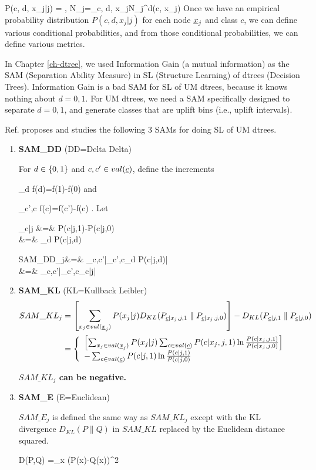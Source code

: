 \documentclass[12pt]{report}
\begin{document}
\beq
P(c, d, x_j|j)
=
\;,\;\; 
N_j=\sum_{c, d, x_j}N_j^d(c, x_j)
\eeq
Once
we have an empirical probability distribution
$P(c, d, x_j| j)$ for each node $\rvx_j$ and
class $c$,
we can define various conditional
probabilities, and from those
conditional probabilities,
we can define various metrics.



In Chapter
\ref{ch-dtree},
we used Information
Gain
(a mutual information)
as the SAM (Separation Ability Measure)
in
SL (Structure Learning)
of dtrees (Decision Trees).
Information Gain
is a bad
SAM for SL of UM dtrees,
because it knows nothing about
 $d=0,1$.
For
UM dtrees,
we need a SAM specifically
designed to separate $d=0,1$, and generate
classes that are
 uplift bins (i.e., uplift intervals).


Ref.\cite{jaros}
proposes and studies
the following
3 SAMs
for doing SL of UM dtrees.


\begin{enumerate}
\item{\bf SAM\_DD} (DD=Delta Delta)

For $d\in \{0,1\}$
and $c, c'\in val(\rvc)$, define the increments

\beq
\partial_d f(d)=f(1)-f(0)
\eeq
and

\beq
\partial_{c',c} f(c)=f(c')-f(c)
\;.
\eeq
Let

\beqa
\Delta_{c|j} &=& P(c|j,1)-P(c|j,0)
\\
&=& \partial_d P(c|j,d)
\label{eq-delta-c-j}
\eeqa

\beqa
SAM\_DD_j&=& \max_{c,c'}|\partial_{c',c}\partial_d P(c|j,d)|
\\
&=&
\max_{c,c'}|\partial_{c',c}\Delta_{c|j}|
\eeqa

\item{\bf SAM\_KL} (KL=Kullback Leibler)
\begin{align}
SAM\_KL_j&=
\left[
\sum_{x_j\in val(\rvx_j)}
P(x_j|j)
D_{KL}(P_{\rvc|x_j,j,1}\parallel P_{\rvc|x_j,j,0})
\right]
-
D_{KL}(P_{\rvc|j,1}\parallel P_{\rvc|j,0})
\\
&=\left\{\begin{array}{l}
\left[
\sum_{x_j\in val(\rvx_j)}
P(x_j|j)
 \sum_{c\in val(\rvc)}P(c|x_j,j,1)
\ln \frac{P(c|x_j,j,1) }{ P(c|x_j,j,0) }
\right]
\\
-
\sum_{c\in val(\rvc)}
P(c|j,1)
\ln \frac{P(c|j,1) }{ P(c|j,0) }
\end{array}
\right.
\label{eq-sam-kl}
\end{align}

{\bf $SAM\_KL_j$ can be negative.}

\item {\bf SAM\_E} (E=Euclidean)

$SAM\_E_j$ is defined the same way as $SAM\_KL_j$
except with
the KL divergence $D_{KL}(P\parallel Q)$
in $SAM\_KL$ replaced
by the Euclidean distance squared.


\beq
D(P,Q) =\sum_x (P(x)-Q(x))^2
\eeq

\end{enumerate}
\end{document}
